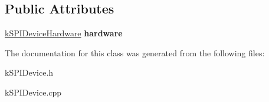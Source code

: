 \subsection*{Public Attributes}
\begin{DoxyCompactItemize}
\item 
\hyperlink{classkSPIDeviceHardware}{k\+S\+P\+I\+Device\+Hardware} {\bfseries hardware}\hypertarget{classkSPIDevice_a9713a103f247eef36a68e26318c93bef}{}\label{classkSPIDevice_a9713a103f247eef36a68e26318c93bef}

\end{DoxyCompactItemize}


The documentation for this class was generated from the following files\+:\begin{DoxyCompactItemize}
\item 
k\+S\+P\+I\+Device.\+h\item 
k\+S\+P\+I\+Device.\+cpp\end{DoxyCompactItemize}
